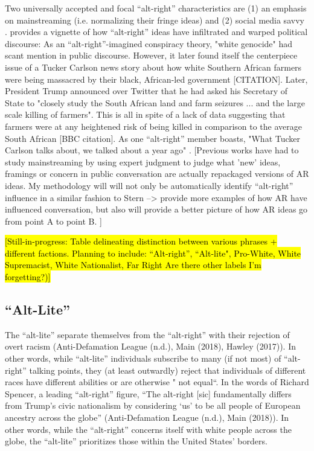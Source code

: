 \documentclass[acmlarge, screen, authorversion]{acmart}
\begin{document}
Two universally accepted and focal “alt-right” characteristics are (1) an emphasis on
mainstreaming (i.e. normalizing their fringe ideas) and (2) social media
savvy \cite{sternProudBoysWhite2019, nagleKillAllNormies2017, gallaherMainstreamingWhiteSupremacy2020}. 
 \citet{sternProudBoysWhite2019} provides a vignette of how ``alt-right'' ideas have infiltrated and warped political discourse: As an ``alt-right''-imagined conspiracy theory, "white genocide" had scant mention in public discourse. However, it later found itself the centerpiece issue of a Tucker Carlson news story about how white Southern African farmers were being massacred by their black, African-led government [CITATION]. Later, President Trump announced over Twitter that he had asked his Secretary of State to "closely study the South African land and farm seizures ... and the large scale killing of farmers". This is all in spite of a lack of data suggesting that farmers were at any heightened risk of being killed in comparison to the average South African [BBC citation]. As one ``alt-right'' member boasts, "What Tucker Carlson talks about, we talked about a year ago" \cite{janetreitmanLawEnforcementFailed2018}. [Previous works have had to study mainstreaming by using expert judgment to judge what 'new' ideas, framings or concern in public conversation are actually repackaged versions of AR ideas. My methodology will will not only be automatically identify ``alt-right'' influence in a similar fashion to Stern --> provide more examples of how AR have influenced conversation, but also will provide a better picture of how AR ideas go from point A to point B. ]

\medskip

\hl{[Still-in-progress: Table delineating distinction between various phrases + different factions. 
Planning to include: ``Alt-right'', ``Alt-lite", Pro-White, White Supremacist, White Nationalist, Far Right
Are there other labels I'm forgetting?)]}

\medskip

\subsection{“Alt-Lite”}

The “alt-lite” separate themselves from the “alt-right” with their
rejection of overt racism (Anti-Defamation League (n.d.), Main (2018),
Hawley (2017)). In other words, while “alt-lite” individuals subscribe
to many (if not most) of “alt-right” talking points, they (at least
outwardly) reject that individuals of different races have different
abilities or are otherwise " not equal“. In the words of Richard
Spencer, a leading ``alt-right'' figure, “The alt-right [sic] fundamentally
differs from Trump’s civic nationalism by considering ‘us’ to be all
people of European ancestry across the globe” (Anti-Defamation League
(n.d.), Main (2018)). In other words, while the “alt-right” concerns
itself with white people across the globe, the “alt-lite” prioritizes
those within the United States’ borders.
\end{document}
